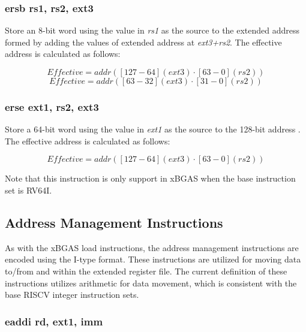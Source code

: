 \documentclass{article}
\begin{document}
\subsubsection{ersb rs1, rs2, ext3}

Store an 8-bit word using the value in \textit{rs1} as the source 
to the extended address formed by adding the values of
extended address at \textit{ext3+rs2}.  The effective address is calculated 
as follows: 

\begin{equation}
Effective = addr([127-64](ext3) \cdot [63-0](rs2))
\end{equation}
\begin{equation}
Effective = addr([63-32](ext3) \cdot [31-0](rs2))
\end{equation}

\subsubsection{erse ext1, rs2, ext3}

Store a 64-bit word using the value in \textit{ext1} as the source 
to the 128-bit address .  The effective address is calculated 
as follows: 

\begin{equation}
Effective = addr([127-64](ext3) \cdot [63-0](rs2))
\end{equation}

\begin{commentary}
Note that this instruction is only support in xBGAS when the base 
instruction set is RV64I.
\end{commentary}

\subsection{Address Management Instructions}
\label{sec:AddressManagementInstructions}

As with the xBGAS load instructions, the address management instructions 
are encoded using the I-type format.  These instructions are utilized for 
moving data to/from and within the extended register file.  The current 
definition of these instructions utilizes arithmetic for data movement, 
which is consistent with the base RISCV integer instruction sets.

\subsubsection{eaddi rd, ext1, imm}
\end{document}
